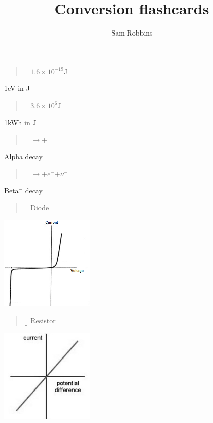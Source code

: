 \documentclass[grid,avery5371]{flashcards}
\title{Conversion flashcards}
\author{Sam Robbins}
\begin{document}
\begin{flashcard}[1eV=]{%
\begin{verse}[\versewidth]
\Huge{$1.6\times10^{-19}$J}
\end{verse}}
1eV in J
\end{flashcard}

\begin{flashcard}[1kWh=]{%
\begin{verse}[\versewidth]
\Huge{$3.6\times10^{6}$J}
\end{verse}}
1kWh in J
\end{flashcard}

\begin{flashcard}{%
\begin{verse}[\versewidth]
\Huge{$\rightarrow$+}
\end{verse}}
Alpha decay
\end{flashcard}

\begin{flashcard}{%
\begin{verse}[\versewidth]
\Huge{$\rightarrow$+$e^-$+$\nu^-$}
\end{verse}}
Beta$^-$ decay
\end{flashcard}

\begin{flashcard}[]{%
\begin{verse}[\versewidth]
\Huge{Diode}
\end{verse}}
\includegraphics[width=4.5cm, height=4.5cm]{Diode.png}
\end{flashcard}

\begin{flashcard}[]{%
\begin{verse}[\versewidth]
\Huge{Resistor}
\end{verse}}
\includegraphics[width=4.5cm, height=4.5cm]{Resistor.jpg}
\end{flashcard}
\end{document}
